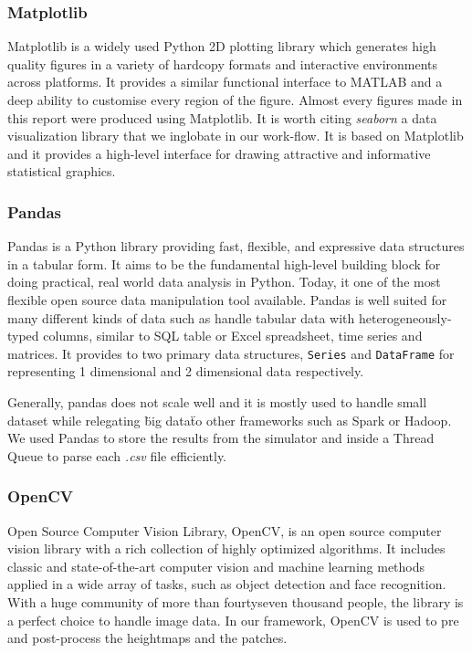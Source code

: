 \documentclass[../document.tex]{subfiles}
\begin{document}
\subsubsection{Matplotlib}
Matplotlib is a widely used Python 2D plotting library which generates high  quality figures in a variety of hardcopy formats and interactive environments across platforms. It provides a similar functional interface to MATLAB and a deep ability to customise every region of the figure. Almost every figures made in this report were produced using Matplotlib.
It is worth citing \emph{seaborn} a data visualization library that we inglobate in our work-flow. It is based on Matplotlib and it provides a high-level interface for drawing attractive and informative statistical graphics.
\subsubsection{Pandas}

Pandas is a Python library providing fast, flexible, and expressive data structures in a tabular form. It aims to be the fundamental high-level building block for doing practical, real world data analysis in Python. Today, it one of the most flexible open source data manipulation tool available. Pandas is well suited for many different kinds of data such as handle tabular data with heterogeneously-typed columns, similar to SQL table or Excel spreadsheet, time series and matrices. It provides to two primary data structures, \texttt{Series} and \texttt{DataFrame} for representing 1 dimensional and 2 dimensional  data respectively.  

Generally, pandas does not scale well and it is mostly used to handle small dataset while relegating \"big data\" to other frameworks such as Spark or Hadoop. We used Pandas to store the results from the simulator and inside a Thread Queue to parse each \emph{.csv} file efficiently. 
\subsubsection{OpenCV}
Open Source Computer Vision Library, OpenCV, is an open source computer vision library with a rich collection of highly optimized algorithms. It includes classic and state-of-the-art computer vision and machine learning methods applied in a wide array of tasks, such as object detection and face recognition.
 With a huge community of more than fourtyseven thousand people, the library is a perfect choice to handle image data. 
In our framework, OpenCV is used to pre and post-process the heightmaps and the patches.
\end{document}
